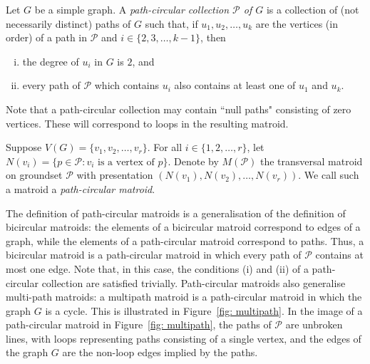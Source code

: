 \documentclass[11pt, reqno]{amsart}
\begin{document}
Let $G$ be a simple graph. A \emph{path-circular collection $\mathcal P$ of $G$} is a collection of (not necessarily distinct) paths of $G$ such that, if $u_1,u_2,\ldots,u_k$ are the vertices (in order) of a path in $\mathcal P$ and $i \in \{2,3,\ldots,k-1\}$, then
\begin{enumerate}[(i)]
	\item the degree of $u_i$ in $G$ is $2$, and
	\item every path of $\mathcal P$ which contains $u_i$ also contains at least one of $u_1$ and $u_k$.
\end{enumerate}
Note that a path-circular collection may contain ``null paths" consisting of zero vertices. These will correspond to loops in the resulting matroid.

Suppose $V(G) = \{v_1,v_2,\ldots,v_r\}$. For all $i \in \{1,2,\ldots,r\}$, let $N(v_i) = \{p \in \mathcal P : v_i \text{ is a vertex of } p\}$. Denote by $M(\mathcal P)$ the transversal matroid on groundset $\mathcal P$ with presentation $(N(v_1),N(v_2),\ldots,N(v_r))$. We call such a matroid a \emph{path-circular matroid}.

The definition of path-circular matroids is a generalisation of the definition of bicircular matroids: the elements of a bicircular matroid correspond to edges of a graph, while the elements of a path-circular matroid correspond to paths. Thus, a bicircular matroid is a path-circular matroid in which every path of $\mathcal P$ contains at most one edge. Note that, in this case, the conditions (i) and (ii) of a path-circular collection are satisfied trivially. Path-circular matroids also generalise multi-path matroids: a multipath matroid is a path-circular matroid in which the graph $G$ is a cycle. This is illustrated in Figure~\ref{fig: multipath}. In the image of a path-circular matroid in Figure~\ref{fig: multipath}, the paths of $\mathcal P$ are unbroken lines, with loops representing paths consisting of a single vertex, and the edges of the graph $G$ are the non-loop edges implied by the paths.
\end{document}
